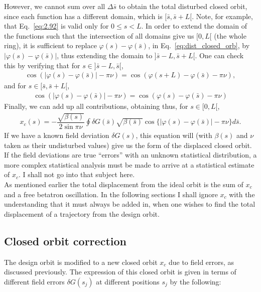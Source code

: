 However, we cannot sum over all $\Delta \bar{s}$ to obtain the total disturbed closed orbit, since each function has a different domain, which is $[\bar{s},\bar{s}+L[$. Note, for example, that Eq.~\eqref{eq:2.92} is valid only for $0 \leq s < L$. In order to extend the domain of the functions such that the intersection of all domains give us $[0,L[$ (the whole ring), it is sufficient to replace $\varphi(s) - \varphi(\bar{s})$, in Eq.~\eqref{eq:dist_closed_orb}, by $|\varphi(s) - \varphi(\bar{s})|$, thus extending the domain to $]\bar{s}-L,\bar{s}+L[$. One can check this by verifying that for $s \in ]\bar{s}-L,\bar{s}[$,
\begin{align*}
	\cos(|\varphi(s) - \varphi(\bar{s})| - \pi\nu) = \cos(\varphi(s+L) - \varphi(\bar{s})-\pi\nu),
\end{align*}
and for $s \in [\bar{s},\bar{s}+L[$,
\begin{align*}
\cos(|\varphi(s) - \varphi(\bar{s})| - \pi\nu) = \cos(\varphi(s) - \varphi(\bar{s}) - \pi\nu)
\end{align*}
Finally, we can add up all contributions, obtaining thus, for $s \in [0,L[$,
\begin{align}\label{eq:2.94}
	\boxed{ x_c(s) = -\dfrac{\sqrt{\beta(s)}}{2\sin\pi\nu} \oint \delta G(\bar{s}) \sqrt{\beta(\bar{s})}\cos\{ |\varphi(s) - \varphi(\bar{s})| - \pi\nu \} d\bar{s} }.
\end{align}
If we have a known field deviation $\delta G(s)$, this equation will (with $\beta(s)$ and $\nu$ taken as their undisturbed values) give us the form of the displaced closed orbit.\\
If the field deviations are true ``errors'' with an unknown statistical distribution, a more complex statistical analysis must be made to arrive at a statistical estimate of $x_c$. I shall not go into that subject here.\\
As mentioned earlier the total displacement from the ideal orbit is the sum of $x_c$ and a free betatron oscillation. In the following sections I shall ignore $x_c$ with the understanding
 that it must always be added in, when one wishes to find the total displacement of a trajectory
 from the design orbit.

 \subsection{Closed orbit correction}
The design orbit is modified to a new closed orbit $x_c$ due to field errors, as discussed previously. The expression of this closed orbit is given in terms of different field errors $\delta G(s_j)$ at different positions $s_j$
by the following:

